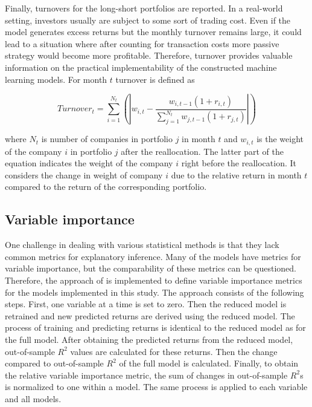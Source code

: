 \documentclass[12pt]{article}
\begin{document}
Finally, turnovers for the long-short portfolios are reported. In a real-world setting, investors usually are subject to some sort of trading cost. Even if the model generates excess returns but the monthly turnover remains large, it could lead to a situation where after counting for transaction costs more passive strategy would become more profitable. Therefore, turnover provides valuable information on the practical implementability of the constructed machine learning models. For month $t$ turnover is defined as \par

\begin{equation}
\label{eq:Turnover}
Turnover_t = \sum_{i=1}^{N_t}  \left ( \left | w_{i, t} - \frac{w_{i, t-1}(1 + r_{i, t})}{ \sum_{j=1}^{N_{t}} w_{j, t-1}(1 + r_{j, t})} \right | \right )
\end{equation}

where $N_t$ is number of companies in portfolio $j$ in month $t$ and $w_{i, t}$ is the weight of the company $i$ in portfolio $j$ after the reallocation. The latter part of the equation indicates the weight of the company $i$ right before the reallocation. It considers the change in weight of company $i$ due to the relative return in month $t$ compared to the return of the corresponding portfolio.

\subsection{Variable importance} \label{VariableImportance}

One challenge in dealing with various statistical methods is that they lack common metrics for explanatory inference. Many of the models have metrics for variable importance, but the comparability of these metrics can be questioned. Therefore, the approach of \citet{guetal} is implemented to define variable importance metrics for the models implemented in this study. The approach consists of the following steps. First, one variable at a time is set to zero. Then the reduced model is retrained and new predicted returns are derived using the reduced model. The process of training and predicting returns is identical to the reduced model as for the full model. After obtaining the predicted returns from the reduced model, out-of-sample $R^2$ values are calculated for these returns. Then the change compared to out-of-sample $R^2$ of the full model is calculated. Finally, to obtain the relative variable importance metric, the sum of changes in out-of-sample $R^2$s is normalized to one within a model. The same process is applied to each variable and all models.\footnotemark {} \par
\end{document}
